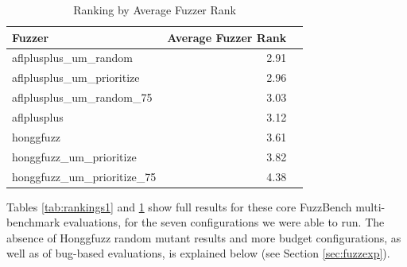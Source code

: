     \begin{table}
      \begin{tabular}{l|r|r}
        Fuzzer & Average Fuzzer Rank \\
        \hline
        \hline
aflplusplus\_um\_random &	2.91 \\
aflplusplus\_um\_prioritize &	2.96 \\
aflplusplus\_um\_random\_75	& 3.03 \\
aflplusplus	& 3.12 \\
honggfuzz	& 3.61 \\
honggfuzz\_um\_prioritize &	3.82 \\
honggfuzz\_um\_prioritize\_75	& 4.38 \\
      \end{tabular}
      \caption{Ranking by Average Fuzzer Rank}
      \label{tab:rankings2}
    \end{table}
    
Tables \ref{tab:rankings1} and \ref{tab:rankings2} show full results for these core FuzzBench multi-benchmark evaluations, for the seven configurations we were able to run.  The absence of Honggfuzz random mutant results and more budget configurations, as well as of bug-based evaluations, is explained below (see Section \ref{sec:fuzzexp}).


